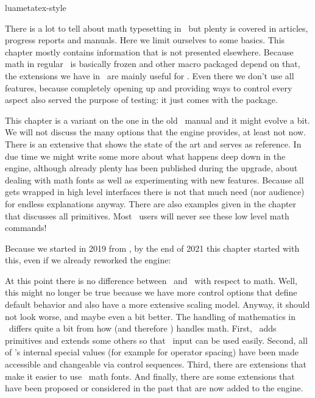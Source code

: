
\environment luametatex-style

\startdocument[title=Math]

\startsection[title={Introduction}]

There is a lot to tell about math typesetting in \LUAMETATEX\ but plenty is
covered in articles, progress reports and manuals. Here we limit ourselves to
some basics. This chapter mostly contains information that is not presented
elsewhere. Because math in regular \TEX\ is basically frozen and other macro
packaged depend on that, the extensions we have in \LUAMETATEX\ are mainly useful
for \CONTEXT. Even there we don't use all features, because completely opening up
and providing ways to control every aspect also served the purpose of testing: it
just comes with the package.

This chapter is a variant on the one in the old \LUAMETATEX\ manual and it might
evolve a bit. We will not discuss the many options that the engine provides, at
least not now. There is an extensive  that shows the
state of the art and serves as reference. In due time we might write some more
about what happens deep down in the engine, although already plenty has been
published during the upgrade, about dealing with math fonts as well as
experimenting with new features. Because all gets wrapped in high level
interfaces there is not that much need (nor audience) for endless explanations
anyway. There are also examples given in the chapter that discusses all
primitives. Most \CONTEXT\ users will never see these low level math commands!

\stopsection

\startsection[title={Traditional alongside \OPENTYPE}]

Because we started in 2019 from \LUATEX, by the end of 2021 this chapter started
with this, even if we already reworked the engine:

\startquotation
At this point there is no difference between \LUAMETATEX\ and \LUATEX\ with
respect to math. Well, this might no longer be true because we have more control
options that define default behavior and also have a more extensive scaling
model. Anyway, it should not look worse, and maybe even a bit better. The
handling of mathematics in \LUATEX\ differs quite a bit from how  (and
therefore \PDFTEX) handles math. First, \LUATEX\ adds primitives and extends some
others so that \UNICODE\ input can be used easily. Second, all of 's
internal special values (for example for operator spacing) have been made
accessible and changeable via control sequences. Third, there are extensions that
make it easier to use \OPENTYPE\ math fonts. And finally, there are some
extensions that have been proposed or considered in the past that are now added
to the engine.

